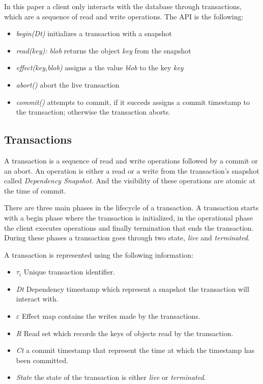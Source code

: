 \documentclass[systeme]{compas2022}
\begin{document}
In this paper a client only interacts with the database through transactions, which are a sequence of read and write operations.
The API is the following:
\begin{itemize}
  \item \emph{begin(Dt)} initializes a transaction with a snapshot
  \item \emph{read(key): blob} returns the object \emph{key} from the snapshot
  \item \emph{effect(key,blob)} assigns a the value \emph{blob} to the key \emph{key}
  \item \emph{abort()} abort the live transaction
  \item \emph{commit()} attempts to commit, if it succeds assigns a commit timestamp to the transaction; otherwise the transaction aborts.
\end{itemize}


\subsection{Transactions}

A transaction is a sequence of read and write operations followed by a commit or an abort.
An operation is either a read or a write from the transaction's snapshot called \emph{Dependency Snapshot}.
And the visibility of these operations are atomic at the time of commit.

There are three main phases in the lifecycle of a transaction.
A transaction starts with a begin phase where the transaction is initialized, in the operational phase the client executes operations and finally termination that ends the transaction.
During these phases a transaction goes through two state, \emph{live} and \emph{terminated}.

A transaction is represented using the following information:
\begin{itemize}
\item \emph{$\tau_i$} Unique transaction identifier.
\item \emph{Dt} Dependency timestamp which represent a snapshot the transaction will interact with.
\item \emph{$\varepsilon$} Effect map contains the writes made by the transactions.
\item \emph{R} Read set which records the keys of objects read by the transaction.
\item \emph{Ct} a commit timestamp that represent the time at which the timestamp has been committed.
\item \emph{State} the state of the transaction is either \emph{live} or \emph{terminated}.\\
\end{itemize}
\end{document}
